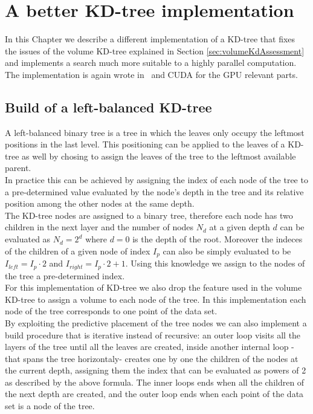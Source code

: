 \chapter{A better KD-tree implementation}\label{ch:fkdtree}
In this Chapter we describe a different implementation of a KD-tree that fixes the issues of the volume KD-tree explained in Section \ref{sec:volumeKdAssessment} and implements a search much more suitable to a highly parallel computation. The implementation is again wrote in \CC\ and CUDA for the GPU relevant parts.

\section{Build of a left-balanced KD-tree}
A left-balanced binary tree is a tree in which the leaves only occupy the leftmost positions in the last level. This positioning can be applied to the leaves of a KD-tree as well by chosing to assign the leaves of the tree to the leftmost available parent.\\
In practice this can be achieved by assigning the index of each node of the tree to a pre-determined value evaluated by the node's depth in the tree and its relative position among the other nodes at the same depth.\\
The KD-tree nodes are assigned to a binary tree, therefore each node has two children in the next layer and the number of nodes $N_d$ at a given depth $d$ can be evaluated as $N_d = 2^d$ where $d = 0$ is the depth of the root. Moreover the indeces of the children of a given node of index $I_p$ can also be simply evaluated to be $I_{left} = I_p \cdot 2$ and $I_{right} = I_p \cdot 2 + 1$. Using this knowledge we assign to the nodes of the tree a pre-determined index.\\
For this implementation of KD-tree we also drop the feature used in the volume KD-tree to assign a volume to each node of the tree. In this implementation each node of the tree corresponds to one point of the data set.\\
By exploiting the predictive placement of the tree nodes we can also implement a build procedure that is iterative instead of recursive: an outer loop visits all the layers of the tree until all the leaves are created, inside another internal loop -that spans the tree horizontaly- creates one by one the children of the nodes at the current depth, assigning them the index that can be evaluated as powers of 2 as described by the above formula. The inner loops ends when all the children of the next depth are created, and the outer loop ends when each point of the data set is a node of the tree.\\
